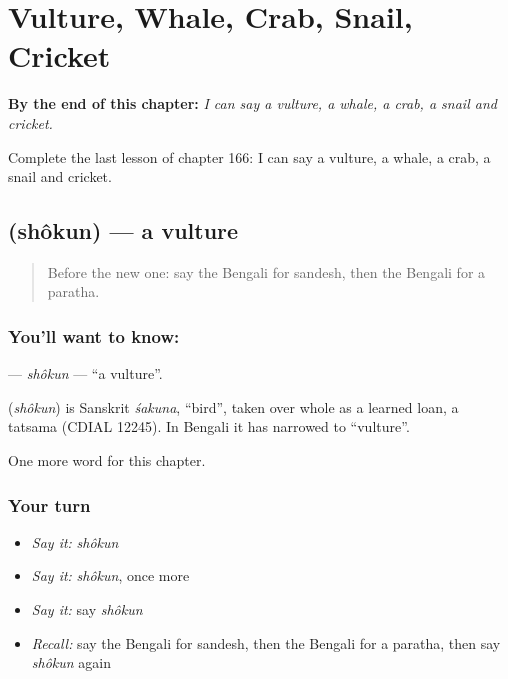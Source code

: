 
\chapter{Vulture, Whale, Crab, Snail, Cricket}
\label{ch:bn-vulture-whale-crab-snail-cricket}

\begin{chapteropening}
\textbf{By the end of this chapter:} \emph{I can say a vulture, a whale, a crab, a snail and cricket.}

Complete the last lesson of chapter 166: I can say a vulture, a whale, a crab, a snail and cricket.
\end{chapteropening}

\section[\texorpdfstring{\bn{শকুন} (shôkun)}{শকুন (shôkun)}]{ (shôkun) — a vulture}

\label{lesson:BN-C166-shokun}



\begin{quote}
Before the new one: say the Bengali for sandesh, then the Bengali for a paratha.
\end{quote}

\subsection*{You'll want to know: }
\textbf{} — \emph{shôkun} — \textquotedblleft{}a vulture\textquotedblright{}.

\begin{cousinweb}
\textbf{} (\emph{shôkun}) is Sanskrit \emph{śakuna}, \textquotedblleft{}bird\textquotedblright{}, taken over whole as a learned loan, a tatsama (CDIAL 12245). In Bengali it has narrowed to \textquotedblleft{}vulture\textquotedblright{}.
\end{cousinweb}

\begin{grammarlens}[title={What you've built}]
One more word for this chapter.
\end{grammarlens}

\subsection*{Your turn}
\begin{itemize}
\raggedright
  \item \emph{Say it:} \emph{shôkun}
  \item \emph{Say it:} \emph{shôkun}, once more
  \item \emph{Say it:} say \emph{shôkun}
  \item \emph{Recall:} say the Bengali for sandesh, then the Bengali for a paratha, then say \emph{shôkun} again
\end{itemize}

